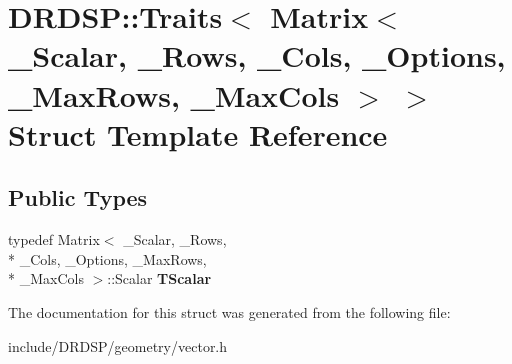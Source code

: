 \hypertarget{struct_d_r_d_s_p_1_1_traits_3_01_matrix_3_01___scalar_00_01___rows_00_01___cols_00_01___options_7f94984544c1bbd2d14e661033a6db2c}{\section{D\-R\-D\-S\-P\-:\-:Traits$<$ Matrix$<$ \-\_\-\-Scalar, \-\_\-\-Rows, \-\_\-\-Cols, \-\_\-\-Options, \-\_\-\-Max\-Rows, \-\_\-\-Max\-Cols $>$ $>$ Struct Template Reference}
\label{struct_d_r_d_s_p_1_1_traits_3_01_matrix_3_01___scalar_00_01___rows_00_01___cols_00_01___options_7f94984544c1bbd2d14e661033a6db2c}
}
\subsection*{Public Types}
\begin{DoxyCompactItemize}
\item 
\hypertarget{struct_d_r_d_s_p_1_1_traits_3_01_matrix_3_01___scalar_00_01___rows_00_01___cols_00_01___options_7f94984544c1bbd2d14e661033a6db2c_afafc8db9b7ec6e18a81aa0b25cd2f729}{typedef Matrix$<$ \-\_\-\-Scalar, \-\_\-\-Rows, \\*
\-\_\-\-Cols, \-\_\-\-Options, \-\_\-\-Max\-Rows, \\*
\-\_\-\-Max\-Cols $>$\-::Scalar {\bfseries T\-Scalar}}\label{struct_d_r_d_s_p_1_1_traits_3_01_matrix_3_01___scalar_00_01___rows_00_01___cols_00_01___options_7f94984544c1bbd2d14e661033a6db2c_afafc8db9b7ec6e18a81aa0b25cd2f729}

\end{DoxyCompactItemize}


The documentation for this struct was generated from the following file\-:\begin{DoxyCompactItemize}
\item 
include/\-D\-R\-D\-S\-P/geometry/vector.\-h\end{DoxyCompactItemize}
